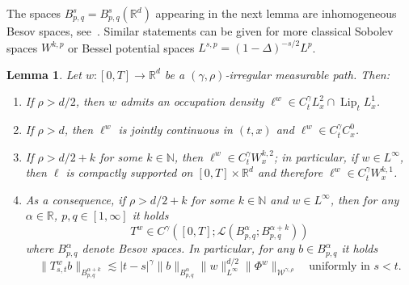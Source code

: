 \documentclass[10pt]{article}
\newcommand{\tmop}[1]{\ensuremath{\operatorname{#1}}}
\newtheorem{lemma}[theorem]{Lemma}
\begin{document}
The spaces $B^s_{p, q} = B^s_{p, q} (\mathbb{R}^d)$ appearing in the next
lemma are inhomogeneous Besov spaces, see~{\cite{bahouri}}. Similar statements
can be given for more classical Sobolev spaces $W^{k, p}$ or Bessel potential
spaces $L^{s, p} = (1 - \Delta)^{- s / 2} L^p$.

\begin{lemma}
  \label{sec2.2 lemma regularity averaging 2}Let $w : [0, T] \rightarrow
  \mathbb{R}^d$ be a $(\gamma, \rho)$\mbox{-}irregular measurable path. Then:
  \begin{enumerate}[label=\roman*.]
    \item If $\rho > d / 2$, then $w$ admits an occupation density $\ell^w \in
    C^{\gamma}_t L^2_x \cap \tmop{Lip}_t L^1_x$.
    
    \item If $\rho > d$, then $\ell^w$ is jointly continuous in $(t, x)$ and
    $\ell^w \in C^{\gamma}_t C^0_x$.
    
    \item If $\rho > d / 2 + k$ for some $k \in \mathbb{N}$, then $\ell^w \in
    C^{\gamma}_t W^{k, 2}_x$; in particular, if $w \in L^{\infty}$, then
    $\ell$ is compactly supported on $[0, T] \times \mathbb{R}^d$ and
    therefore $\ell^w \in C^{\gamma}_t W^{k, 1}_x$.
    
    \item As a consequence, if $\rho > d / 2 + k$ for some $k \in \mathbb{N}$
    and $w \in L^{\infty}$, then for any $\alpha \in \mathbb{R}$, $p, q \in
    [1, \infty]$ it holds
    \[ T^w \in C^{\gamma} ([0, T] ; \mathcal{L} (B^{\alpha}_{p, q} ; B^{\alpha
       + k}_{p, q})) \]
    where $B^{\alpha}_{p, q}$ denote Besov spaces. In particular, for any $b
    \in B^{\alpha}_{p, q}$ it holds
    \[ \| T^w_{s, t} b \|_{B^{\alpha + k}_{p, q}} \lesssim | t - s |^{\gamma}
       \| b \|_{B^{\alpha}_{p, q}} \| w \|_{L^{\infty}}^{d / 2} \| \Phi^w
       \|_{\mathcal{W}^{\gamma, \rho}} \quad \text{uniformly in } s < t. \]
  \end{enumerate}
\end{lemma}
\end{document}
